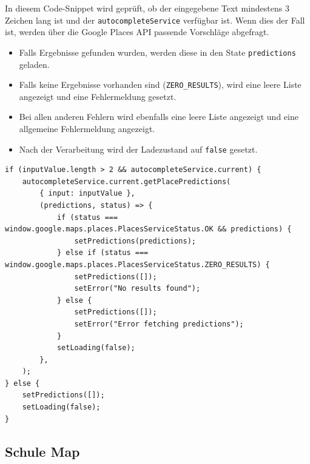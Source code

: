 \begin{inhalt}
\begin{enumerate}[label=\textbf{\arabic*.}]
In diesem Code-Snippet wird geprüft, ob der eingegebene Text mindestens 3 Zeichen lang ist und der \texttt{autocompleteService} verfügbar ist. Wenn dies der Fall ist, werden über die Google Places API passende Vorschläge abgefragt.

\begin{itemize}
    \item Falls Ergebnisse gefunden wurden, werden diese in den State \texttt{predictions} geladen.
    \item Falls keine Ergebnisse vorhanden sind (\texttt{ZERO\_RESULTS}), wird eine leere Liste angezeigt und eine Fehlermeldung gesetzt.
    \item Bei allen anderen Fehlern wird ebenfalls eine leere Liste angezeigt und eine allgemeine Fehlermeldung angezeigt.
    \item Nach der Verarbeitung wird der Ladezustand auf \texttt{false} gesetzt.
\end{itemize}

\vspace{0.5cm}

\begin{lstlisting}[language=mytsx]
if (inputValue.length > 2 && autocompleteService.current) {
    autocompleteService.current.getPlacePredictions(
        { input: inputValue },
        (predictions, status) => {
            if (status === window.google.maps.places.PlacesServiceStatus.OK && predictions) {
                setPredictions(predictions);
            } else if (status === window.google.maps.places.PlacesServiceStatus.ZERO_RESULTS) {
                setPredictions([]);
                setError("No results found");
            } else {
                setPredictions([]);
                setError("Error fetching predictions");
            }
            setLoading(false);
        },
    );
} else {
    setPredictions([]);
    setLoading(false);
}
\end{lstlisting}

\clearpage

\subsection{Schule Map}



\end{enumerate}
\end{inhalt}
